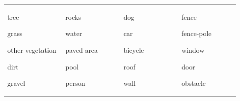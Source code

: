 \begin{tabular}%
{@{}p{0.24\linewidth}@{}p{0.24\linewidth}@{}p{0.24\linewidth}@{}p{0.24\linewidth}@{}}
\begin{minipage}[t]{\linewidth}
  \vspace*{-0cm}
  \begin{compactitem}
    \item tree
    \item grass
    \item other vegetation
    \item dirt
    \item gravel
  \end{compactitem}
\end{minipage} &
\begin{minipage}[t]{\linewidth}
  \vspace*{-0cm}
  \begin{compactitem}
    \item rocks
    \item water
    \item paved area
    \item pool
    \item person
  \end{compactitem}
\end{minipage} &
\begin{minipage}[t]{\linewidth}
  \vspace*{-0cm}
  \begin{compactitem}
    \item dog
    \item car
    \item bicycle
    \item roof
    \item wall
  \end{compactitem}
  
\end{minipage} &
\begin{minipage}[t]{\linewidth}
  \vspace*{-0cm}
  \begin{compactitem}
    \item fence
    \item fence-pole
    \item window
    \item door
    \item obstacle  
  \end{compactitem}
  
\end{minipage}
\end{tabular}
